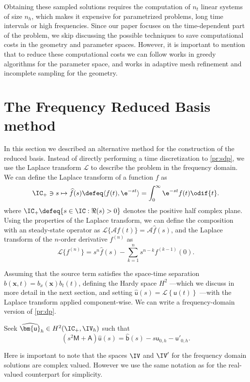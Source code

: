 Obtaining these sampled solutions requires the computation of $n_t$ linear systems of size $n_h$, which makes it expensive for parametrized problems, long time intervals or high frequencies. Since our paper focuses on the time-dependent part of the problem, we skip discussing the possible techniques to save computational costs in the geometry and parameter spaces. However, it is important to mention that to reduce these computational costs we can follow works in greedy algorithms \cite{grepl_posteriori_2005,Rozza2008a} for the parameter space, and works in adaptive mesh refinement \cite{Carlberg2014,Etter2019} and incomplete sampling \cite{everson_karhunenloeve_1995,venturi_gappy_2004,willcox_unsteady_2006,Peherstorfer2016} for the geometry.


\section{The Frequency Reduced Basis method}
\label{sec:FRB}

In this section we described an alternative method for the construction of the reduced basis. Instead of directly performing a time discretization to \cref{pr:sdp}, we use the Laplace transform $\mathcal{L}$ to describe the problem in the frequency domain. We can define the Laplace transform of a function $f$ as
\begin{equation} \label{eq:laplace}
	\IC_+ \ni s \mapsto \widehat{f}(s) \defeq \langle f(t),\e^{-st}\rangle = \int_{0}^{\infty}\e^{-st}f(t) \odif{t}.
\end{equation}
where $\IC_+ \defeq \{ s \in \IC: \Re(s) >0 \}$ denotes the positive half complex plane. Using the properties of the Laplace transform, we can define the composition with an steady-state operator as $\mathcal{L}\{\mathcal{A}f (t)\} = \mathcal{A}\widehat{f}(s)$, and the Laplace transform of the $n$-order derivative $f^{(n)}$ as 
\begin{equation}
    \mathcal{L}\{f^{(n)}\}=s^n\widehat{f}(s)-\sum_{k=1}^n s^{n-k}f^{(k-1)}(0).
\end{equation}

Assuming that the source term satisfies the space-time separation $b(\bm{x},t)=b_x(\bm{x})b_t(t)$, defining the Hardy space $H^2$ ---which we discuss in more detail in the next section, and setting $\widehat{\bm{\mathsf{u}}}(s) = \mathcal{L}\left\{ {\bm{\mathsf{u}}}(t)\right\}$ ---with the Laplace transform applied component-wise. We can write a frequency-domain version of \cref{pr:dp}.
\begin{problem} \label{pr:fdp}
Seek $\widehat{\bm{\mathsf{u}}}_h \in H^2(\IC_+,\IV_h)$ such that
\begin{equation}
    \left(s^2 \bm{\mathsf{M}} + \bm{\mathsf{A}} \right) \widehat{\bm{\mathsf{u}}}(s) = \widehat{\bm{\mathsf{b}}}(s) - s \bm{\mathsf{u}}_{0,h} - \bm{\mathsf{u}}'_{0,h}.
\end{equation}
\end{problem}
Here is important to note that the spaces $\IV$ and $\IV'$ for the frequency domain solutions are complex valued. However we use the same notation as for the real-valued counterpart for simplicity. 

